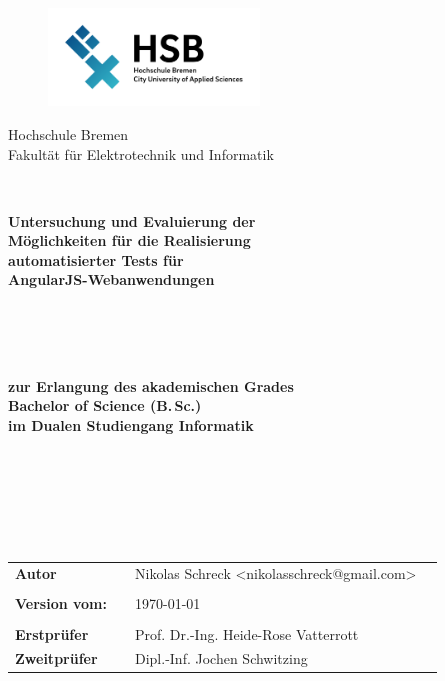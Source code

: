 \thispagestyle{empty}


\begin{figure}[t]
 \centering
 \includegraphics[width=0.5\textwidth]{abb/logo}
\end{figure}


\begin{center}
\Large{Hochschule Bremen}\\
\Large{Fakultät für Elektrotechnik und Informatik}\\
\end{center}



\begin{verbatim}


\end{verbatim}
\begin{center}
\onehalfspacing
\textbf{\LARGE{Untersuchung und Evaluierung der \\ Möglichkeiten für die Realisierung \\ automatisierter Tests für \\AngularJS-Webanwendungen \\}}
\singlespacing
\begin{verbatim}



\end{verbatim}
\textbf{\titleDocument \\ zur Erlangung des akademischen Grades \\ Bachelor of Science (B.\,Sc.) \\ im Dualen Studiengang Informatik}
\end{center}
\begin{verbatim}






\end{verbatim}
\begin{center}
\begin{tabular}{llll}
\textbf{Autor} & & Nikolas Schreck <nikolasschreck@gmail.com> & \\
& & \\
\textbf{Version vom:} & & \today &\\
& & \\
\textbf{Erstprüfer} & & Prof. Dr.-Ing. Heide-Rose Vatterrott&\\
\textbf{Zweitprüfer} & & Dipl.-Inf. Jochen Schwitzing&\\
\end{tabular}
\end{center}